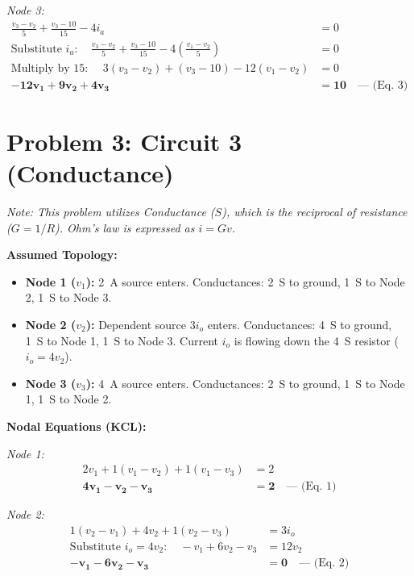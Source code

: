 \documentclass[11pt]{article}
\begin{document}
\textit{Node 3:}
\begin{align*}
  \frac{v_3 - v_2}{5} + \frac{v_3 - 10}{15} - 4i_a &= 0 \\
  \text{Substitute } i_a: \quad \frac{v_3 - v_2}{5} + \frac{v_3 - 10}{15} - 4\left(\frac{v_1 - v_2}{5}\right) &= 0 \\
  \text{Multiply by 15: } \quad 3(v_3 - v_2) + (v_3 - 10) - 12(v_1 - v_2) &= 0 \\
  \mathbf{-12v_1 + 9v_2 + 4v_3} &\mathbf{= 10} \quad \text{--- (Eq. 3)}
\end{align*}

\section*{Problem 3: Circuit 3 (Conductance)}

\textit{Note: This problem utilizes Conductance ($S$), which is the reciprocal of resistance ($G = 1/R$). Ohm's law is expressed as $i = Gv$.}

\textbf{Assumed Topology:}
\begin{itemize}
  \item \textbf{Node 1 ($v_1$):} \SI{2}{\ampere} source enters. Conductances: \SI{2}{\siemens} to ground, \SI{1}{\siemens} to Node 2, \SI{1}{\siemens} to Node 3.
  \item \textbf{Node 2 ($v_2$):} Dependent source $3i_o$ enters. Conductances: \SI{4}{\siemens} to ground, \SI{1}{\siemens} to Node 1, \SI{1}{\siemens} to Node 3. Current $i_o$ is flowing down the \SI{4}{\siemens} resistor ($i_o = 4v_2$).
  \item \textbf{Node 3 ($v_3$):} \SI{4}{\ampere} source enters. Conductances: \SI{2}{\siemens} to ground, \SI{1}{\siemens} to Node 1, \SI{1}{\siemens} to Node 2.
\end{itemize}

\textbf{Nodal Equations (KCL):}

\textit{Node 1:}
\begin{align*}
  2v_1 + 1(v_1 - v_2) + 1(v_1 - v_3) &= 2 \\
  \mathbf{4v_1 - v_2 - v_3} &\mathbf{= 2} \quad \text{--- (Eq. 1)}
\end{align*}

\textit{Node 2:}
\begin{align*}
  1(v_2 - v_1) + 4v_2 + 1(v_2 - v_3) &= 3i_o \\
  \text{Substitute } i_o = 4v_2: \quad -v_1 + 6v_2 - v_3 &= 12v_2 \\
  \mathbf{-v_1 - 6v_2 - v_3} &\mathbf{= 0} \quad \text{--- (Eq. 2)}
\end{align*}
\end{document}
